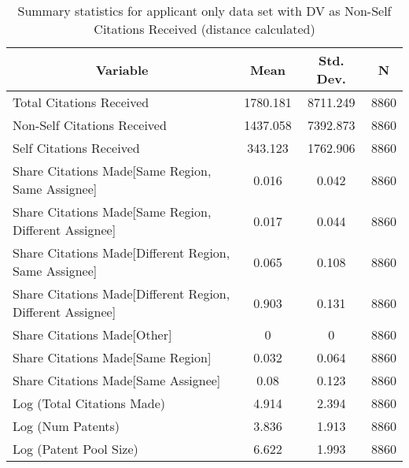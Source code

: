 
\begin{table}[htbp]\centering \caption{Summary statistics for applicant only data set with DV as Non-Self Citations Received (distance calculated) \label{a.nsummary}}
\begin{tabular}{l c c  c}\hline\hline
\multicolumn{1}{c}{\textbf{Variable}} & \textbf{Mean}
 & \textbf{Std. Dev.} & \textbf{N}\\ \hline
Total Citations Received & 1780.181 & 8711.249  & 8860\\
Non-Self Citations Received & 1437.058 & 7392.873  & 8860\\
Self Citations Received & 343.123 & 1762.906  & 8860\\
Share Citations Made[Same Region, Same Assignee] & 0.016 & 0.042  & 8860\\
Share Citations Made[Same Region, Different Assignee] & 0.017 & 0.044  & 8860\\
Share Citations Made[Different Region, Same Assignee] & 0.065 & 0.108  & 8860\\
Share Citations Made[Different Region, Different Assignee] & 0.903 & 0.131  & 8860\\
Share Citations Made[Other] & 0 & 0  & 8860\\
Share Citations Made[Same Region] & 0.032 & 0.064  & 8860\\
Share Citations Made[Same Assignee] & 0.08 & 0.123  & 8860\\
Log (Total Citations Made) & 4.914 & 2.394  & 8860\\
Log (Num Patents) & 3.836 & 1.913  & 8860\\
Log (Patent Pool Size) & 6.622 & 1.993  & 8860\\
\hline\end{tabular}
\end{table}
